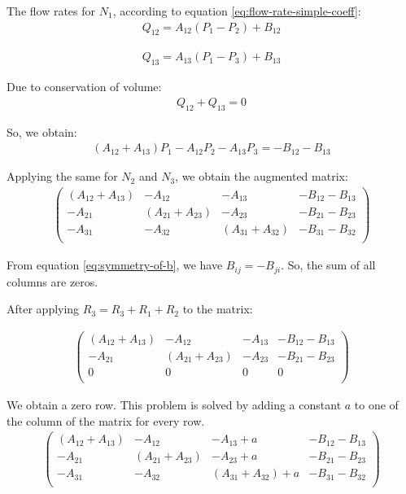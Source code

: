 \documentclass{crm-article}
\begin{document}
			The flow rates for $N_{1}$, according to equation \ref{eq:flow-rate-simple-coeff}:
			\begin{gather}
				Q_{12} = A_{12}(P_1 - P_2) + B_{12}
			\end{gather}
			
			\begin{gather}
				Q_{13} = A_{13}(P_1 - P_3) + B_{13}
			\end{gather}
			
			Due to conservation of volume:
			\begin{gather}
				Q_{12} + Q_{13} = 0
			\end{gather}
			
			So, we obtain:
			\begin{gather}
				(A_{12} + A_{13})P_1 - A_{12}P_2 - A_{13}P_3 = -B_{12} - B_{13}
			\end{gather}
			
			Applying the same for $N_2$ and $N_3$, we obtain the augmented matrix:
			\begin{gather}
				\begin{pmatrix}
					(A_{12} + A_{13}) & -A_{12} & -A_{13} & -B_{12} - B_{13} \\
					-A_{21} & (A_{21} + A_{23}) & -A_{23} & -B_{21} - B_{23} \\
					-A_{31} & -A_{32} & (A_{31} + A_{32}) & -B_{31} - B_{32} \\
				\end{pmatrix}
			\end{gather}
			
			From equation \ref{eq:symmetry-of-b}, we have $B_{ij} = -B_{ji}$. So, the sum of all columns are zeros.
				
			After applying $R_3 = R_3 + R_1 + R_2$ to the matrix:
			
			\begin{gather}
				\begin{pmatrix}
					(A_{12} + A_{13}) & -A_{12} & -A_{13} & -B_{12} - B_{13} \\
					-A_{21} & (A_{21} + A_{23}) & -A_{23} & -B_{21} - B_{23} \\
					0 & 0 & 0 & 0 \\
				\end{pmatrix}
			\end{gather}
			
			We obtain a zero row. This problem is solved by adding a constant $a$ to one of the column of the matrix for every row. 
			\begin{gather}
				\begin{pmatrix}
					(A_{12} + A_{13}) & -A_{12} & -A_{13} + a & -B_{12} - B_{13} \\
					-A_{21} & (A_{21} + A_{23}) & -A_{23} + a & -B_{21} - B_{23} \\
					-A_{31} & -A_{32} & (A_{31} + A_{32}) + a & -B_{31} - B_{32} \\
				\end{pmatrix}
			\end{gather}
			
\end{document}
